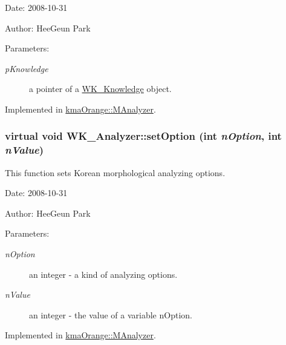 \begin{Desc}
\item[Date:]2008-10-31 \end{Desc}
\begin{Desc}
\item[Author:]HeeGeun Park \end{Desc}
\begin{Desc}
\item[Parameters:]
\begin{description}
\item[{\em pKnowledge}]a pointer of a \hyperlink{classWK__Knowledge}{WK\_\-Knowledge} object. \end{description}
\end{Desc}


Implemented in \hyperlink{classkmaOrange_1_1MAnalyzer_9874ebbac3f7c114600f26763533382b}{kmaOrange::MAnalyzer}.\hypertarget{classWK__Analyzer_9f5685835cc61f22bee056e6bdfa002d}{
\subsubsection[{setOption}]{\setlength{\rightskip}{0pt plus 5cm}virtual void WK\_\-Analyzer::setOption (int {\em nOption}, \/  int {\em nValue})}}
\label{classWK__Analyzer_9f5685835cc61f22bee056e6bdfa002d}


This function sets Korean morphological analyzing options. 

\begin{Desc}
\item[Date:]2008-10-31 \end{Desc}
\begin{Desc}
\item[Author:]HeeGeun Park \end{Desc}
\begin{Desc}
\item[Parameters:]
\begin{description}
\item[{\em nOption}]an integer - a kind of analyzing options. \item[{\em nValue}]an integer - the value of a variable nOption. \end{description}
\end{Desc}


Implemented in \hyperlink{classkmaOrange_1_1MAnalyzer_6dcb62242e1437fe84fcc3dc05d9ca49}{kmaOrange::MAnalyzer}.

